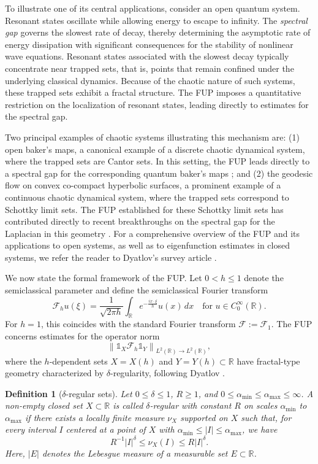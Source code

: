 \documentclass[12pt,reqno]{amsart}
\newcommand\Char{\mathds{1}}
\newcommand\Fc{\mathcal{F}}
\newcommand\R{\mathbb{R}}
\theoremstyle{plain}
\newtheorem{defn}[thm]{\textbf{Definition}}
\theoremstyle{remark}
\numberwithin{equation}{section}
\begin{document}
To illustrate one of its central applications, consider an open quantum system. Resonant states oscillate while allowing energy to escape to infinity. The \textit{spectral gap} governs the slowest rate of decay, thereby determining the asymptotic rate of energy dissipation with significant consequences for the stability of nonlinear wave equations. Resonant states associated with the slowest decay typically concentrate near trapped sets, that is, points that remain confined under the underlying classical dynamics. Because of the chaotic nature of such systems, these trapped sets exhibit a fractal structure. The FUP imposes a quantitative restriction on the localization of resonant states, leading directly to estimates for the spectral gap.

Two principal examples of chaotic systems illustrating this mechanism are: (1) open baker’s maps, a canonical example of a discrete chaotic dynamical system, where the trapped sets are Cantor sets. In this setting, the FUP leads directly to a spectral gap for the corresponding quantum baker’s maps \cite{DJ1, EH}; and (2) the geodesic flow on convex co-compact hyperbolic surfaces, a prominent example of a continuous chaotic dynamical system, where the trapped sets correspond to Schottky limit sets. The FUP established for these Schottky limit sets has contributed directly to recent breakthroughs on the spectral gap for the Laplacian in this geometry \cite{BD1, BD2, DZ}. For a comprehensive overview of the FUP and its applications to open systems, as well as to eigenfunction estimates in closed systems, we refer the reader to Dyatlov’s survey article \cite{Dy}.

We now state the formal framework of the FUP. Let $0<h\le1$ denote the semiclassical parameter and define the semiclassical Fourier transform
$$
\Fc_hu(\xi)=\frac{1}{\sqrt{2\pi h}}\int_{\R}e^{-\frac{ix\cdot \xi}{h}}u(x)\,dx\quad\text{for }u\in C_0^\infty(\R).
$$
For $h=1$, this coincides with the standard Fourier transform $\Fc:=\Fc_1$. The FUP concerns estimates for the operator norm
\begin{equation}\label{eq:FUP}
\left\|\Char_X\Fc_h\Char_Y\right\|_{L^2(\R)\to L^2(\R)},
\end{equation}
where the $h$-dependent sets $X=X(h)$ and $Y=Y(h)\subset\R$ have fractal-type geometry characterized by $\delta$-regularity, following Dyatlov \cite[Definition 2.2]{Dy}.

\begin{defn}[$\delta$-regular sets]\label{defn:reg}
Let $0\le\delta\le1$, $R\ge1$, and $0\le\alpha_{\mathrm{min}}\le\alpha_{\mathrm{max}}\le\infty$. A non-empty closed set $X\subset\R$ is called $\delta$-regular with constant $R$ on scales $\alpha_{\mathrm{min}}$ to $\alpha_{\mathrm{max}}$ if there exists a locally finite measure $\nu_X$ supported on $X$ such that, for every interval $I$ centered at a point of $X$ with $\alpha_{\mathrm{min}}\le|I|\le\alpha_{\mathrm{max}}$, we have
$$R^{-1}|I|^\delta\le\nu_X(I)\le R|I|^\delta.$$
Here, $|E|$ denotes the Lebesgue measure of a measurable set $E\subset\R$.
\end{defn}
\end{document}

